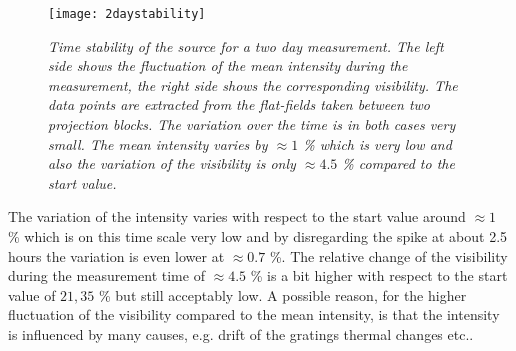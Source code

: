 \begin{figure}[t]
	\begin{center}
		\texttt{[image: 2daystability]}
	\end{center}
	\caption[Time-stability of the source during two days]{\textit{Time stability of the source for a two day measurement. The left side shows the fluctuation of the mean intensity during the measurement, the right side shows the corresponding visibility. The data points are extracted from the flat-fields taken between two projection blocks. The variation over the time is in both cases very small. The mean intensity varies by $\approx1$ \% which is very low and also the variation of the visibility is only $\approx 4.5$ \% compared to the start value.}}
	\label{2daysstabi}
\end{figure}
The variation of the intensity varies with respect to the start value around $\approx 1$ \% which is on this time scale very low and by disregarding the spike at about 2.5 hours the variation is even lower at $\approx 0.7$ \%. The relative change of the visibility during the measurement time of $\approx 4.5$ \% is a bit higher with respect to the start value of $21,35$ \% but still acceptably low. A possible reason, for the higher fluctuation of the visibility compared to the mean intensity, is that the intensity is influenced by many causes, e.g. drift of the gratings thermal changes etc..  
